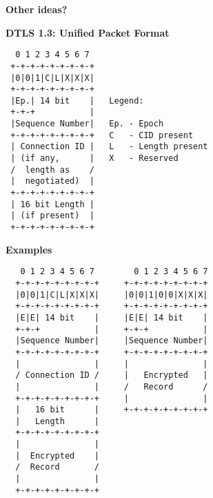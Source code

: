 \documentclass[helvetica]{seminar}
\newcommand{\heading}[1]{%
  \begin{center} 
    \large\bf 
    #1 
  \end{center} 
  \vspace{.4 in}}
\begin{document}
\begin{slide}
  \heading{Other ideas?}
\end{slide}

\begin{slide}
\heading{DTLS 1.3: Unified Packet Format}

{\scriptsize
\begin{verbatim}
  0 1 2 3 4 5 6 7
 +-+-+-+-+-+-+-+-+
 |0|0|1|C|L|X|X|X|
 +-+-+-+-+-+-+-+-+
 |Ep.| 14 bit    |   Legend:
 +-+-+           |
 |Sequence Number|   Ep. - Epoch
 +-+-+-+-+-+-+-+-+   C   - CID present
 | Connection ID |   L   - Length present
 | (if any,      |   X   - Reserved
 /  length as    /
 |  negotiated)  |
 +-+-+-+-+-+-+-+-+
 | 16 bit Length |
 | (if present)  |
 +-+-+-+-+-+-+-+-+
\end{verbatim}
}
\end{slide}

\begin{slide}
\heading{Examples}

\vspace{-.3in}
{\scriptsize
\begin{verbatim}
   0 1 2 3 4 5 6 7        0 1 2 3 4 5 6 7
  +-+-+-+-+-+-+-+-+     +-+-+-+-+-+-+-+-+
  |0|0|1|C|L|X|X|X|     |0|0|1|0|0|X|X|X|
  +-+-+-+-+-+-+-+-+     +-+-+-+-+-+-+-+-+
  |E|E| 14 bit    |     |E|E| 14 bit    |
  +-+-+           |     +-+-+           |
  |Sequence Number|     |Sequence Number|
  +-+-+-+-+-+-+-+-+     +-+-+-+-+-+-+-+-+
  |               |     |               |
  / Connection ID /     |   Encrypted   |
  |               |     /   Record      /
  +-+-+-+-+-+-+-+-+     |               |
  |   16 bit      |     +-+-+-+-+-+-+-+-+
  |   Length      |
  +-+-+-+-+-+-+-+-+
  |               |
  |  Encrypted    |
  /  Record       /
  |               |
  +-+-+-+-+-+-+-+-+
\end{verbatim}
  }
\end{slide}
\end{document}
